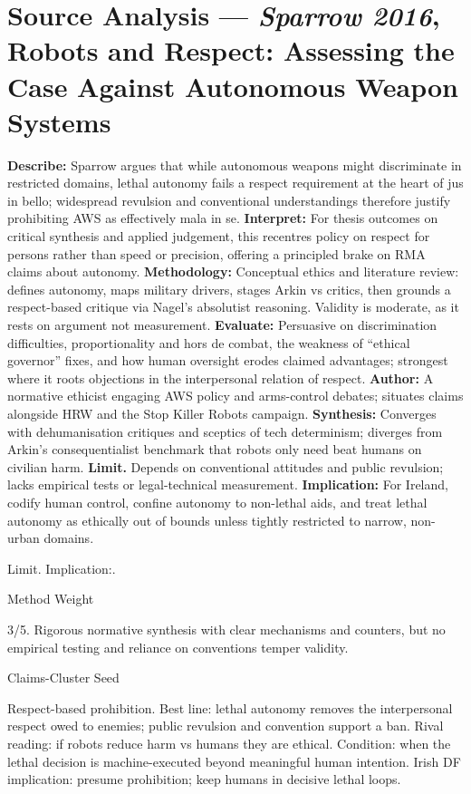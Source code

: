 \section*{Source Analysis — \textit{Sparrow 2016}, Robots and Respect: Assessing the Case Against Autonomous Weapon Systems}
\textbf{Describe:} Sparrow argues that while autonomous weapons might discriminate in restricted domains, lethal autonomy fails a respect requirement at the heart of jus in bello; widespread revulsion and conventional understandings therefore justify prohibiting AWS as effectively mala in se.
\textbf{Interpret:} For thesis outcomes on critical synthesis and applied judgement, this recentres policy on respect for persons rather than speed or precision, offering a principled brake on RMA claims about autonomy.
\textbf{Methodology:} Conceptual ethics and literature review: defines autonomy, maps military drivers, stages Arkin vs critics, then grounds a respect-based critique via Nagel’s absolutist reasoning. Validity is moderate, as it rests on argument not measurement.
\textbf{Evaluate:} Persuasive on discrimination difficulties, proportionality and hors de combat, the weakness of “ethical governor” fixes, and how human oversight erodes claimed advantages; strongest where it roots objections in the interpersonal relation of respect.
\textbf{Author:} A normative ethicist engaging AWS policy and arms-control debates; situates claims alongside HRW and the Stop Killer Robots campaign.
\textbf{Synthesis:} Converges with dehumanisation critiques and sceptics of tech determinism; diverges from Arkin’s consequentialist benchmark that robots only need beat humans on civilian harm.
\textbf{Limit.} Depends on conventional attitudes and public revulsion; lacks empirical tests or legal-technical measurement.
\textbf{Implication:} For Ireland, codify human control, confine autonomy to non-lethal aids, and treat lethal autonomy as ethically out of bounds unless tightly restricted to narrow, non-urban domains.

Limit. Implication:.

Method Weight

3/5. Rigorous normative synthesis with clear mechanisms and counters, but no empirical testing and reliance on conventions temper validity.

Claims-Cluster Seed

Respect-based prohibition.
Best line: lethal autonomy removes the interpersonal respect owed to enemies; public revulsion and convention support a ban.
Rival reading: if robots reduce harm vs humans they are ethical.
Condition: when the lethal decision is machine-executed beyond meaningful human intention.
Irish DF implication: presume prohibition; keep humans in decisive lethal loops.

